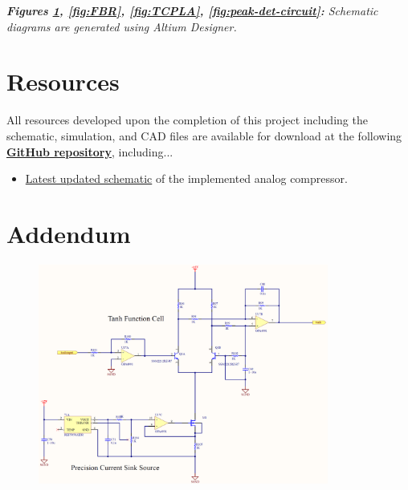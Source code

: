 \documentclass[10pt]{article}
\begin{document}
\begin{multicols*}{2}
{                \noindent\textit{\textbf{Figures \ref{fig:htan-circuit}, \ref{fig:FBR}, \ref{fig:TCPLA}, \ref{fig:peak-det-circuit}:} Schematic diagrams are generated using Altium Designer.}\\
            }

        \section*{Resources}
            All resources developed upon the completion of this project including the schematic, simulation, and CAD files are available for download at the following \textbf{\textcolor{github-butterfly-bush}{\href{https://github.com/ShaunG-RU/DRC-Project}{GitHub repository}}}, including...
            
            \begin{itemize}
                \item \href{https://github.com/ShaunG-RU/DRC-Project/blob/main/Altium/DRC.pdf}{Latest updated schematic} of the implemented analog compressor.
            \end{itemize}

        \printbibliography

    \end{multicols*}

    \newpage

    \section*{Addendum}

        \noindent
        \begin{figure}[h]
            \centering
            \includegraphics[width=0.85\textwidth]{htan-circuit.png}
            \label{fig:htan-circuit}
        \end{figure}
\end{document}
